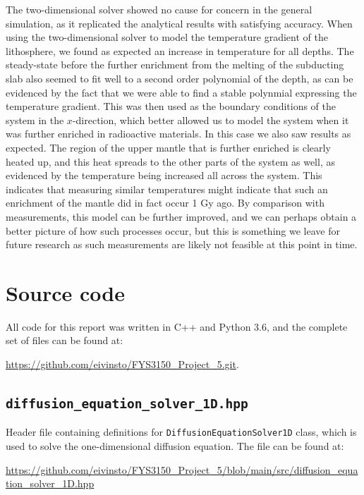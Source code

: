 \documentclass[reprint,english,notitlepage]{revtex4-1}  %
\begin{document}
The two-dimensional solver showed no cause for concern in the general simulation, as it replicated the analytical results with satisfying accuracy. When using the two-dimensional solver to model the temperature gradient of the lithosphere, we found as expected an increase in temperature for all depths. The steady-state before the further enrichment from the melting of the subducting slab also seemed to fit well to a second order polynomial of the depth, as can be evidenced by the fact that we were able to find a stable polynmial expressing the temperature gradient. This was then used as the boundary conditions of the system in the $x$-direction, which better allowed us to model the system when it was further enriched in radioactive materials. In this case we also saw results as expected. The region of the upper mantle that is further enriched is clearly heated up, and this heat spreads to the other parts of the system as well, as evidenced by the temperature being increased all across the system. This indicates that measuring similar temperatures might indicate that such an enrichment of the mantle did in fact occur 1 Gy ago. By comparison with measurements, this model can be further improved, and we can perhaps obtain a better picture of how such processes occur, but this is something we leave for future research as such measurements are likely not feasible at this point in time. 



   

\onecolumngrid
{}
\newpage
\twocolumngrid

\appendix
\section{Source code} \label{A}
All code for this report was written in C++ and Python 3.6, and the complete set of files can be found at:

\url{https://github.com/eivinsto/FYS3150_Project_5.git}.

\cprotect\subsection{\verb+diffusion_equation_solver_1D.hpp+} \label{A.1}

Header file containing definitions for \verb+DiffusionEquationSolver1D+ class, which is used to solve the one-dimensional diffusion equation. The file can be found at:

\url{https://github.com/eivinsto/FYS3150_Project_5/blob/main/src/diffusion_equation_solver_1D.hpp}
\end{document}
